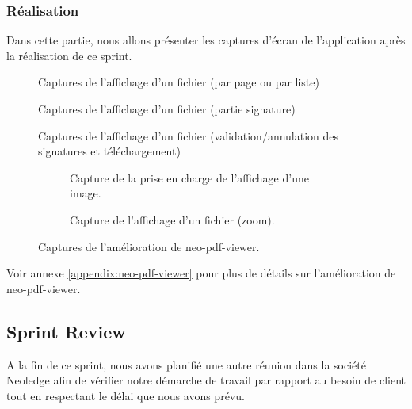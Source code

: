 \subsubsection{Réalisation}

Dans cette partie, nous allons présenter les captures d'écran de l'application après la réalisation de ce sprint.

\begin{figure}[H]
  \centering
  \caption{Captures de l'affichage d'un fichier (par page ou par liste)}
  \label{fig:realisation_file_1}
\end{figure}
\begin{figure}[H]
  \centering
  \caption{Captures de l'affichage d'un fichier (partie signature)}
  \label{fig:realisation_file_2}
\end{figure}
\begin{figure}[H]
  \centering
  \caption{Captures de l'affichage d'un fichier (validation/annulation des signatures et téléchargement)}
  \label{fig:realisation_file_3}
\end{figure}

\begin{figure}[H]
  \begin{subfigure}[t]{0.4\textwidth}
  \centering
  \caption{Capture de la prise en charge de l'affichage d'une image.}
  \label{fig:prendre_en_charge_image}
  \end{subfigure}\hfill
  \begin{subfigure}[t]{0.4\textwidth}
  \centering
  \caption{Capture de l'affichage d'un fichier (zoom).}
  \label{fig:zoom}
  \end{subfigure}
  \caption{Captures de l'amélioration de neo-pdf-viewer.}
\label{fig:zoom_and_image}
\end{figure}

Voir annexe \ref{appendix:neo-pdf-viewer} pour plus de détails sur l'amélioration de neo-pdf-viewer.


\subsection{Sprint Review}


A la fin de ce sprint, nous avons planifié une autre réunion dans la société Neoledge  afin de vérifier notre démarche de travail par rapport au besoin de client tout en respectant le délai que nous avons prévu.

